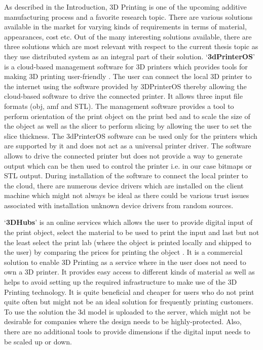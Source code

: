 As described in the Introduction, 3D Printing is one of the upcoming additive manufacturing process and a favorite research topic. There are various solutions available in the market for varying kinds of requirements in terms of material, appearances, cost etc. Out of the many interesting solutions available, there are three solutions which are most relevant with respect to the current thesis topic as they use distributed system as an integral part of their solution. {\lq}\textbf{3dPrinterOS}{\rq} is a cloud-based management software for 3D printers which provides tools for making 3D printing user-friendly \cite{3dprinteros}. The user can connect the local 3D printer to the internet using the software provided by 3DPrinterOS thereby allowing the cloud-based software to drive the connected printer. It allows three input file formats (obj, amf and STL). The management software provides a tool to perform orientation of the print object on the print bed and to scale the size of the object as well as the slicer to perform slicing by allowing the user to set the slice thickness. The 3dPrinterOS software can be used only for the printers which are supported by it and does not act as a universal printer driver. The software allows to drive the connected printer but does not provide a way to generate output which can be then used to control the printer i.e. in our case bitmaps or STL output. During installation of the software to connect the local printer to the cloud, there are numerous device drivers which are installed on the client machine which might not always be ideal as there could be various trust issues associated with installation unknown device drivers from random sources. \newline

{\lq}\textbf{3DHubs}{\rq} is an online services which allows the user to provide digital input of the print object, select the material to be used to print the input and last but not the least select the print lab (where the object is printed locally and shipped to the user) by comparing the prices for printing the object \cite{3dhub}. It is a commercial solution to enable 3D Printing as a service where in the user does not need to own a 3D printer. It provides easy access to different kinds of material as well as helps to avoid setting up the required infrastructure to make use of the 3D Printing technology. It is quite beneficial and cheaper for users who do not print quite often but might not be an ideal solution for frequently printing customers. To use the solution the 3d model is uploaded to the server, which might not be desirable for companies where the design needs to be highly-protected. Also, there are no additional tools to provide dimensions if the digital input needs to be scaled up or down. \newline     


